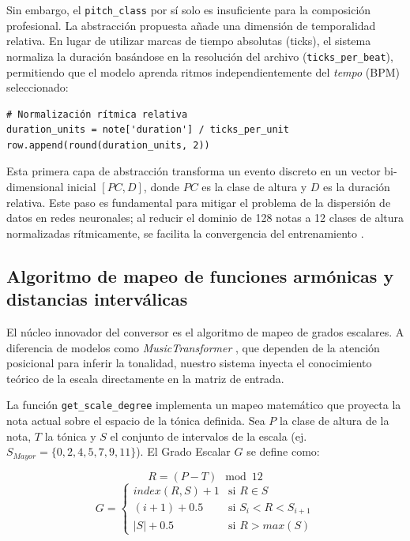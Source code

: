 Sin embargo, el \texttt{pitch\_class} por sí solo es insuficiente para la composición profesional. La abstracción propuesta añade una dimensión de temporalidad relativa. En lugar de utilizar marcas de tiempo absolutas (ticks), el sistema normaliza la duración basándose en la resolución del archivo (\texttt{ticks\_per\_beat}), permitiendo que el modelo aprenda ritmos independientemente del \textit{tempo} (BPM) seleccionado:

\begin{verbatim}
# Normalización rítmica relativa
duration_units = note['duration'] / ticks_per_unit
row.append(round(duration_units, 2))
\end{verbatim}

Esta primera capa de abstracción transforma un evento discreto en un vector bi-dimensional inicial $[PC, D]$, donde $PC$ es la clase de altura y $D$ es la duración relativa. Este paso es fundamental para mitigar el problema de la dispersión de datos en redes neuronales; al reducir el dominio de 128 notas a 12 clases de altura normalizadas rítmicamente, se facilita la convergencia del entrenamiento \cite{briot2020deep}.

\subsection{Algoritmo de mapeo de funciones armónicas y distancias interválicas}

El núcleo innovador del conversor es el algoritmo de mapeo de grados escalares. A diferencia de modelos como \textit{MusicTransformer} \cite{huang2018music}, que dependen de la atención posicional para inferir la tonalidad, nuestro sistema inyecta el conocimiento teórico de la escala directamente en la matriz de entrada.

La función \texttt{get\_scale\_degree} implementa un mapeo matemático que proyecta la nota actual sobre el espacio de la tónica definida. Sea $P$ la clase de altura de la nota, $T$ la tónica y $S$ el conjunto de intervalos de la escala (ej. $S_{Mayor} = \{0, 2, 4, 5, 7, 9, 11\}$). El Grado Escalar $G$ se define como:

\begin{equation}
R = (P - T) \mod 12
\end{equation}
\begin{equation}
G = 
\begin{cases} 
index(R, S) + 1 & \text{si } R \in S \\
(i + 1) + 0.5 & \text{si } S_i < R < S_{i+1} \\
|S| + 0.5 & \text{si } R > max(S)
\end{cases}
\end{equation}

